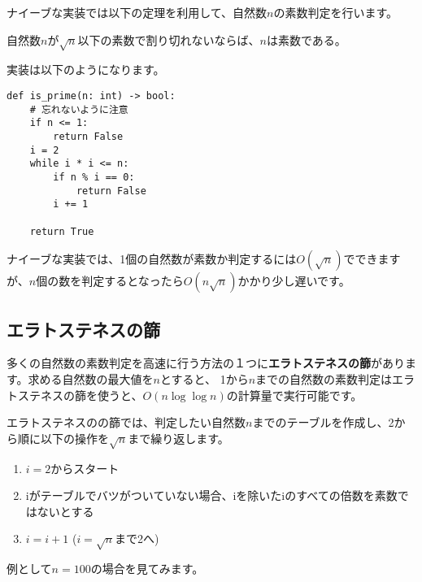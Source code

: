 \documentclass{jlreq}
\begin{document}
ナイーブな実装では以下の定理を利用して、自然数$n$の素数判定を行います。

\begin{tcolorbox}[enhanced,title=定理1, 
  attach boxed title to top left, 
  colback=white!95!blue,
  colbacktitle=white!10!blue!50!black,
  drop fuzzy shadow,
  boxrule=0.25mm,
  ]
  自然数$n$が$\sqrt{n}$以下の素数で割り切れないならば、$n$は素数である。
\end{tcolorbox}
実装は以下のようになります。

\begin{lstlisting}[caption=ナイーブな素数判定, frame=TRBL, label={naivePriem}]
def is_prime(n: int) -> bool:
    # 忘れないように注意
    if n <= 1:
        return False
    i = 2
    while i * i <= n:
        if n % i == 0:
            return False
        i += 1
    
    return True

\end{lstlisting}

ナイーブな実装では、1個の自然数が素数か判定するには$O(\sqrt{n})$でできますが、$n$個の数を判定するとなったら$O(n \sqrt{n})$かかり少し遅いです。

\subsection{エラトステネスの篩}
多くの自然数の素数判定を高速に行う方法の１つに\textbf{エラトステネスの篩}があります。求める自然数の最大値を$n$とすると、
1から$n$までの自然数の素数判定はエラトステネスの篩を使うと、$O(n \log \log n)$の計算量で実行可能です。

エラトステネスのの篩では、判定したい自然数$n$までのテーブルを作成し、2から順に以下の操作を$\sqrt{n}$まで繰り返します。

\begin{enumerate}
  \item $i = 2$からスタート
  \item iがテーブルでバツがついていない場合、iを除いたiのすべての倍数を素数ではないとする
  \item $i = i + 1$ ($i = \sqrt{n}$まで2へ)
\end{enumerate}

例として$n = 100$の場合を見てみます。

\newpage
\end{document}
